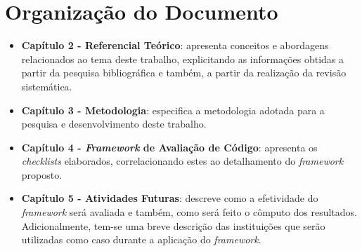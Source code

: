 \section{Organização do Documento}

\begin{itemize}
	\item \textbf{Capítulo 2 - Referencial Teórico}: apresenta conceitos e abordagens relacionados ao tema deste trabalho, explicitando as informações obtidas a partir da pesquisa bibliográfica e também, a partir da realização da revisão sistemática.

	\item \textbf{Capítulo 3 - Metodologia}: especifica a metodologia adotada para a pesquisa e desenvolvimento deste trabalho.

	\item \textbf{Capítulo 4 - \textit{Framework} de Avaliação de Código}: apresenta os \textit{checklists} elaborados, correlacionando estes ao detalhamento do \textit{framework} proposto.

	\item \textbf{Capítulo 5 - Atividades Futuras}: descreve como a efetividade do \textit{framework} será avaliada e também, como será feito o cômputo dos resultados. Adicionalmente, tem-se uma breve descrição das instituições que serão utilizadas como caso durante a aplicação do \textit{framework}.
\end{itemize}
